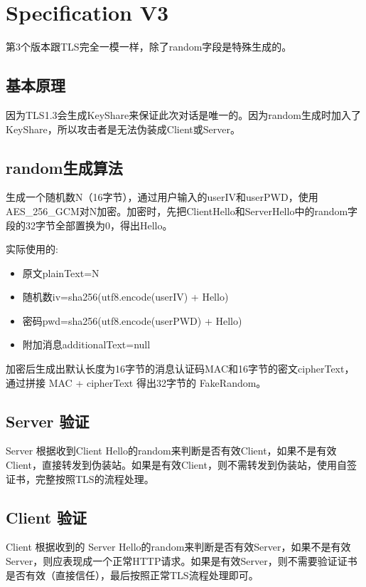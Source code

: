 \chapter{Specification V3}
第3个版本跟TLS完全一模一样，除了random字段是特殊生成的。

\section{基本原理}
因为TLS1.3会生成KeyShare来保证此次对话是唯一的。因为random生成时加入了KeyShare，所以攻击者是无法伪装成Client或Server。

\section{random生成算法}
生成一个随机数N（16字节），通过用户输入的userIV和userPWD，使用AES\_256\_GCM对N加密。加密时，先把ClientHello和ServerHello中的random字段的32字节全部置换为0，得出Hello。

实际使用的:
\begin{itemize}
	\item 原文plainText=N
	\item 随机数iv=sha256(utf8.encode(userIV) + Hello)
	\item 密码pwd=sha256(utf8.encode(userPWD) + Hello)
	\item 附加消息additionalText=null
\end{itemize}

加密后生成出默认长度为16字节的消息认证码MAC和16字节的密文cipherText，通过拼接 MAC + cipherText 得出32字节的 FakeRandom。

\section{Server 验证}
Server 根据收到Client Hello的random来判断是否有效Client，如果不是有效Client，直接转发到伪装站。如果是有效Client，则不需转发到伪装站，使用自签证书，完整按照TLS的流程处理。

\section{Client 验证}
Client 根据收到的 Server Hello的random来判断是否有效Server，如果不是有效Server，则应表现成一个正常HTTP请求。如果是有效Server，则不需要验证证书是否有效（直接信任），最后按照正常TLS流程处理即可。
